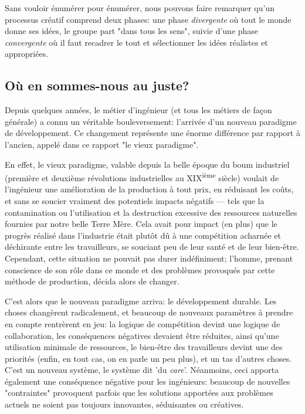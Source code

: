 Sans vouloir énumérer pour énumérer, nous pouvons faire remarquer qu'un processus créatif comprend deux phases: une phase \textit{divergente} où tout le monde donne ses idées, le groupe part "dans tous les sens", suivie d'une phase \textit{convergente} où il faut recadrer le tout et sélectionner les idées réalistes et appropriées.

\subsection{Où en sommes-nous au juste?}

Depuis quelques années, le métier d’ingénieur (et tous les métiers de façon générale) a connu un véritable bouleversement: l'arrivée d'un nouveau paradigme de développement. Ce changement représente une énorme différence par rapport à l'ancien, appelé dans ce rapport "le vieux paradigme". 

En effet, le vieux paradigme, valable depuis la belle époque du boum industriel (première et deuxième révolutions industrielles au XIX\textsuperscript{ième} siècle) voulait de l’ingénieur une amélioration de la production à tout prix, en réduisant les coûts, et sans se soucier vraiment des potentiels impacts négatifs --- tels que la contamination ou l'utilisation et la destruction excessive des ressources naturelles fournies par notre belle Terre Mère. Cela avait pour impact (en plus) que le progrès réalisé dans l'industrie était plutôt dû à une compétition acharnée et déchirante entre les travailleurs, se souciant peu de leur santé et de leur bien-être. Cependant, cette situation ne pouvait pas durer indéfiniment; l'homme, prenant conscience de son rôle dans ce monde et des problèmes provoqués par cette méthode de production, décida alors de changer.

C'est alors que le nouveau paradigme arriva: le développement durable. Les choses changèrent radicalement, et beaucoup de nouveaux paramètres à prendre en compte rentrèrent en jeu: la logique de compétition devint une logique de collaboration, les conséquences négatives devaient être réduites, ainsi qu'une utilisation minimale de ressources, le bien-être des travailleurs devint une des priorités (enfin, en tout cas, on en parle un peu plus), et un tas d'autres choses. C'est un nouveau système, le système dit 'du \textit{care}'. Néanmoins, ceci apporta également une conséquence négative pour les ingénieurs: beaucoup de nouvelles "contraintes" provoquent parfois que les solutions apportées aux problèmes actuels ne soient pas toujours innovantes, séduisantes ou créatives.


